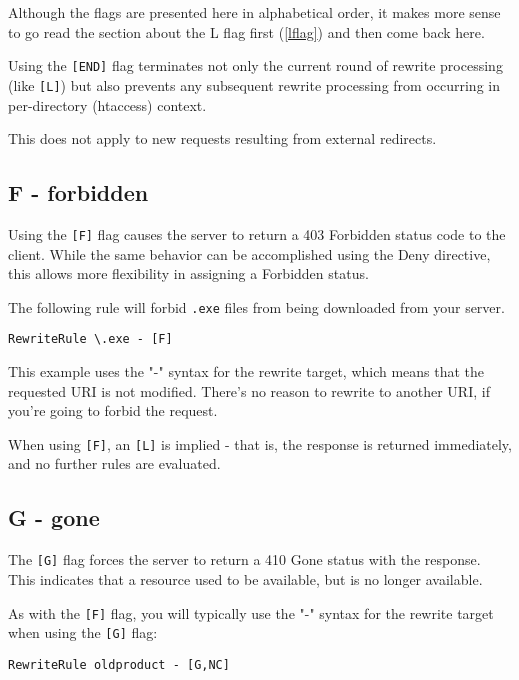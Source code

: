 Although the flags are presented here in alphabetical order, it makes more sense to go read the section about the L flag first (\ref{lflag}) and then come back here.

Using the \verb~[END]~ flag terminates not only the current round of rewrite processing (like \verb~[L]~) but also prevents any subsequent rewrite processing from occurring in per-directory (htaccess) context.

This does not apply to new requests resulting from external redirects.

\subsection{F - forbidden}
\label{fflag}

Using the \verb~[F]~ flag causes the server to return a 403 Forbidden status code to the client. While the same behavior can be accomplished using the Deny directive, this allows more flexibility in assigning a Forbidden status.

The following rule will forbid \verb~.exe~ files from being downloaded from your server.

\begin{verbatim}
RewriteRule \.exe - [F]
\end{verbatim}

This example uses the "-" syntax for the rewrite target, which means that the requested URI is not modified. There's no reason to rewrite to another URI, if you're going to forbid the request.

When using \verb~[F]~, an \verb~[L]~ is implied - that is, the response is returned immediately, and no further rules are evaluated.

\subsection{G - gone}
\label{gflag}

The \verb~[G]~ flag forces the server to return a 410 Gone status with the response. This indicates that a resource used to be available, but is no longer available.

As with the \verb~[F]~ flag, you will typically use the "-" syntax for the rewrite target when using the \verb~[G]~ flag:

\begin{verbatim}
RewriteRule oldproduct - [G,NC]
\end{verbatim}

